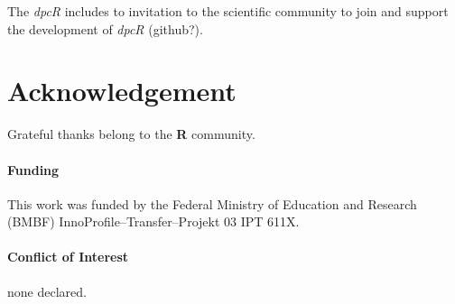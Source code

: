 \documentclass{bioinfo}
\begin{document}
The \textit{dpcR} includes 
to invitation to the scientific community to join and support the development of 
\textit{dpcR} (github?).

\section*{Acknowledgement}

Grateful thanks belong to the \textbf{R} community.

\paragraph{Funding\textcolon} This work was funded by the Federal Ministry of Education and Research (BMBF)
 InnoProfile--Transfer--Projekt 03 IPT 611X.

\paragraph{Conflict of Interest\textcolon} none declared.

%
%
%
%
%
%

%

\end{document}
